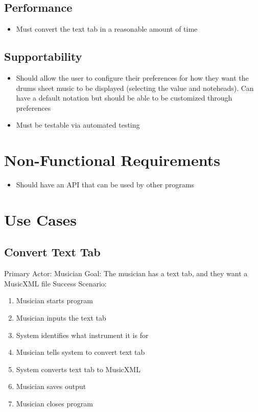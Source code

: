 \documentclass[11pt]{article}
\begin{document}
\subsection{Performance}
\label{sec:org9511297}
\begin{itemize}
\item Must convert the text tab in a reasonable amount of time
\end{itemize}

\subsection{Supportability}
\label{sec:org1b56580}
\begin{itemize}
\item Should allow the user to configure their preferences for how they want the drums sheet music to be displayed (selecting the value and noteheads). Can have a default notation but should be able to be customized through preferences
\item Must be testable via automated testing
\end{itemize}

\section{Non-Functional Requirements}
\label{sec:org0a22bb7}
\begin{itemize}
\item Should have an API that can be used by other programs
\end{itemize}

\section{Use Cases}
\label{sec:org3737700}
\subsection{Convert Text Tab}
\label{sec:org4e1c05b}
Primary Actor: Musician
Goal: The musician has a text tab, and they want a MusicXML file
Success Scenario:
\begin{enumerate}
\item Musician starts program
\item Musician inputs the text tab
\item System identifies what instrument it is for
\item Musician tells system to convert text tab
\item System converts text tab to MusicXML
\item Musician saves output
\item Musician closes program
\end{enumerate}
\end{document}
